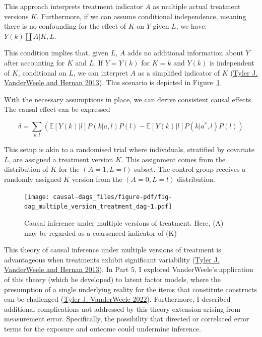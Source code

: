 \documentclass[
  singlecolumn]{article}
\begin{document}
This approach interprets treatment indicator \(A\) as multiple actual
treatment versions \(K\). Furthermore, if we can assume conditional
independence, meaning there is no confounding for the effect of \(K\) on
\(Y\) given \(L\), we have: \(Y(k)\coprod A|K,L\).

This condition implies that, given \(L\), \(A\) adds no additional
information about \(Y\) after accounting for \(K\) and \(L\). If
\(Y = Y(k)\) for \(K = k\) and \(Y(k)\) is independent of \(K\),
conditional on \(L\), we can interpret \(A\) as a simplified indicator
of \(K\) (\protect\hyperlink{ref-vanderweele2013}{Tyler J. VanderWeele
and Hernan 2013}). This scenario is depicted in
Figure~\ref{fig-dag_multiple_version_treatment_dag}.

With the necessary assumptions in place, we can derive consistent causal
effects. The causal effect can be expressed

\[ \delta = \sum_{k,l} \left( \mathbb{E}[Y(k)|l] P(k|a,l) P(l) - \mathbb{E}[Y(k)|l] P(k|a^*,l) P(l) \right) \]

This setup is akin to a randomised trial where individuals, stratified
by covariate \(L\), are assigned a treatment version \(K\). This
assignment comes from the distribution of \(K\) for the
\((A = 1, L = l)\) subset. The control group receives a randomly
assigned \(K\) version from the \((A = 0, L = l)\) distribution.

\begin{figure}

{\centering \texttt{[image: causal-dags\_files/figure-pdf/fig-dag\_multiple\_version\_treatment\_dag-1.pdf]}

}

\caption{\label{fig-dag_multiple_version_treatment_dag}Causal inference
under multiple versions of treatment. Here, (A) may be regarded as a
coarseneed indicator of (K)}

\end{figure}

This theory of causal inference under multiple versions of treatment is
advantageous when treatments exhibit significant variability
(\protect\hyperlink{ref-vanderweele2013}{Tyler J. VanderWeele and Hernan
2013}). In Part 5, I explored VanderWeele's application of this theory
(which he developed) to latent factor models, where the presumption of a
single underlying reality for the items that constitute constructs can
be challenged (\protect\hyperlink{ref-vanderweele2022}{Tyler J.
VanderWeele 2022}). Furthermore, I described additional complications
not addressed by this theory extension arising from measurement error.
Specifically, the possibility that directed or correlated error terms
for the exposure and outcome could undermine inference.
\end{document}
